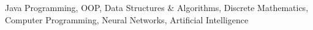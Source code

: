 

\begin{cvskills}

    {Java Programming, OOP,
    Data Structures \& Algorithms, Discrete Mathematics, Computer Programming,
    Neural Networks, Artificial Intelligence}

\end{cvskills}
